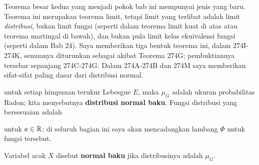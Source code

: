 
\def\chaptername{Teori probabilitas}
\def\sectionname{Teorema limit pusat}


Teorema besar kedua yang menjadi pokok bab ini mempunyai jenis yang baru.
Teorema ini merupakan teorema limit, tetapi limit yang terlibat adalah limit
{\it distribusi}, bukan limit fungsi (seperti dalam teorema limit kuat di atas
atau teorema martingal di bawah), dan bukan pula limit kelas ekuivalensi fungsi
(seperti dalam Bab 24). Saya memberikan tiga bentuk teorema ini, dalam
274I-274K, semuanya diturunkan sebagai akibat Teorema 274G; pembuktiannya
tersebar sepanjang 274C-274G. Dalam 274A-274B dan 274M saya memberikan
sifat-sifat paling dasar dari distribusi normal.



\noindent untuk setiap himpunan terukur Lebesgue $E$, maka $\mu_G$ adalah
ukuran probabilitas Radon; kita menyebutnya {\bf distribusi
normal baku}. Fungsi distribusi yang bersesuaian adalah


\noindent untuk $a\in\Bbb R$; di seluruh bagian ini saya akan mencadangkan
lambang $\Phi$ untuk fungsi tersebut.


 Variabel acak $X$ disebut {\bf normal baku}
jika distribusinya adalah $\mu_G$.

